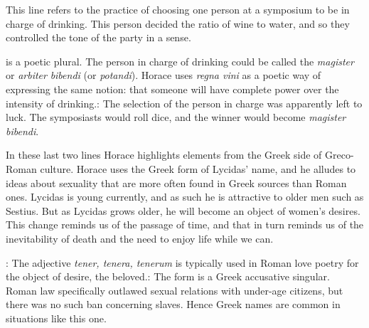 
This line refers to the practice of choosing one person at a symposium to be in charge of drinking.  This person decided the ratio of wine to water, and so they controlled the tone of the party in a sense. 

 is a poetic plural.  The person in charge of drinking could be called the \textit{magister} or \textit{arbiter} \textit{bibendi} (or \textit{potandi}).  Horace uses \textit{regna vini} as a poetic way of expressing the same notion: that someone will have complete power over the intensity of drinking.\indent{}: The selection of the person in charge was apparently left to luck.  The symposiasts would roll dice, and the winner would become \textit{magister bibendi}.


In these last two lines Horace highlights elements from the Greek side of Greco-Roman culture.  Horace uses the Greek form of Lycidas' name, and he alludes to ideas about sexuality that are more often found in Greek sources than Roman ones.  Lycidas is young currently, and as such he is attractive to older men such as Sestius.  But as Lycidas grows older, he will become an object of women's desires.  This change reminds us of the passage of time, and that in turn reminds us of the inevitability of death and the need to enjoy life while we can.

: The adjective \textit{tener, tenera, tenerum} is typically used in Roman love poetry for the object of desire, the beloved.\indent{}: The form is a Greek accusative singular.  Roman law specifically outlawed sexual relations with under-age citizens, but there was no such ban concerning slaves.  Hence Greek names are common in situations like this one.

